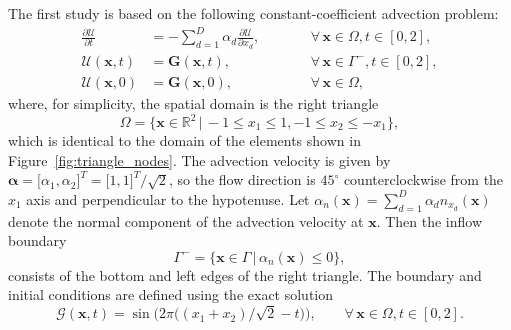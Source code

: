 \documentclass[pdflatex,sn-mathphys-num]{sn-jnl}%
\theoremstyle{thmstyleone}%
\theoremstyle{thmstyletwo}%
\theoremstyle{thmstylethree}%
\newcommand{\fnc}[1]{\ensuremath{\mathcal{#1}}}
\begin{document}
The first study is based on the following constant-coefficient advection problem:
\begin{equation}\label{eq:advection}
\begin{alignedat}{2}
    \frac{\partial \fnc{U}}{\partial t} &= -\sum_{d=1}^{D} \alpha_d \frac{\partial \fnc{U}}{\partial x_d},&\qquad &\forall\, \bm{x} \in \Omega, t \in [0,2], \\
    \fnc{U}(\bm{x},t) &= \bm{G}(\bm{x},t), &\qquad&\forall\, \bm{x} \in \Gamma^{-}, t \in [0,2], \\
    \fnc{U}(\bm{x},0) &= \bm{G}(\bm{x},0), &\qquad&\forall\, \bm{x} \in \Omega,
\end{alignedat}
\end{equation}
where, for simplicity, the spatial domain is the right triangle
\begin{equation*}
\Omega = \{ \bm{x} \in \mathbb{R}^2 \,|\, -1 \leq x_1 \leq 1, -1 \leq x_2 \leq -x_1\},
\end{equation*}
which is identical to the domain of the elements shown in Figure~\ref{fig:triangle_nodes}.  The advection velocity is given by $\bm{\alpha} = \big[\alpha_1, \alpha_2\big]^T = \big[1,1\big]^T/\sqrt{2}$, so the flow direction is $45^\circ$ counterclockwise from the $x_1$ axis and perpendicular to the hypotenuse.  Let $\alpha_n(\bm{x}) = \sum_{d=1}^{D} \alpha_d n_{x_d}(\bm{x})$ denote the normal component of the advection velocity at $\bm{x}$.  Then the inflow boundary 
\begin{equation*}
    \Gamma^{-} = \{ \bm{x} \in \Gamma \,|\, \alpha_n(\bm{x}) \leq 0 \},
\end{equation*}
consists of the bottom and left edges of the right triangle.  The boundary and initial conditions are defined using the exact solution
\begin{equation*}
    \fnc{G}(\bm{x}, t) = \sin \Big( 2\pi \big(  (x_1 + x_2)/\sqrt{2}  - t \big) \Big), \qquad \forall\, \bm{x} \in \Omega, t \in [0,2].
\end{equation*}
\end{document}
